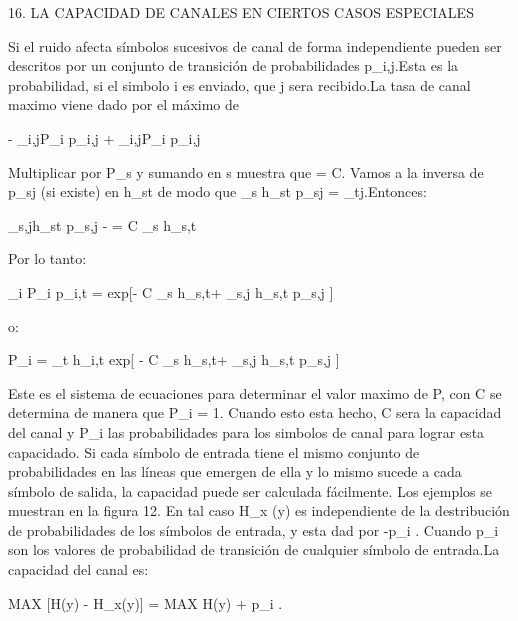 \begin{centerMe gusta ·  · Compartir · Hace 9 minutos · }
\begin{center}
16. LA CAPACIDAD DE CANALES EN CIERTOS CASOS ESPECIALES
\end{center}

Si el ruido afecta símbolos sucesivos de canal de forma independiente pueden ser descritos por un conjunto de transici\'on de probabilidades p_{i,j}.Esta es la probabilidad, si el simbolo i es enviado, que j sera recibido.La tasa de canal maximo viene dado por el m\'aximo de

\begin{center}
- \sum_{i,j}P_i p_{i,j}  + \sum_{i,j}P_i p_{i,j}
\end{center}
 
Multiplicar por P_s y sumando en s muestra que \mu = C. Vamos a la inversa de p_{sj} (si existe) en h_{st}  de modo que \sum_{s} h_{st} p_{sj} = \delta_{tj}.Entonces: 

\begin{center}
\sum_{s,j}h_{st} p_{s,j}  -  = C \sum_{s} h_{s,t}
\end{center}
Por lo tanto:

\begin{center}
\sum_{i} P_i p_{i,t} = exp[- C \sum_{s} h_{s,t}+ \sum_{s,j} h_{s,t} p_{s,j} ]
\end{center}

o:  
\begin{center}
P_i = \sum_{t} h_{i,t} exp[ - C \sum_{s} h_{s,t}+ \sum_{s,j} h_{s,t} p_{s,j}  ]
\end{center}


Este es el sistema de ecuaciones para determinar el valor maximo de P, con C se determina de manera que \sum P_i = 1. Cuando esto esta hecho, C sera la capacidad del canal y P_i las probabilidades para los simbolos de canal para lograr esta capacidado.
Si cada s\'imbolo de entrada tiene el mismo conjunto de probabilidades en las l\'ineas que emergen de ella y lo mismo sucede a cada s\'imbolo de salida, la capacidad puede ser calculada f\'acilmente. Los ejemplos se muestran en la figura 12. En tal caso H_x (y) es independiente de la destribuci\'on de probabilidades de los s\'imbolos de entrada, y esta dad por -\sum p_i . Cuando p_i son los valores de probabilidad de transici\'on de cualquier s\'imbolo de entrada.La capacidad del canal es:

\begin{center}
MAX [H(y) - H_x(y)] = MAX H(y) + \sum p_i .
\end{center}
  

\end{centerMe gusta ·  · Compartir · Hace 9 minutos · }
